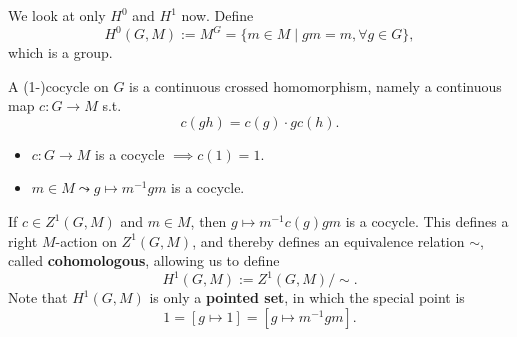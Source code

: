We look at only $H^0$ and $H^1$ now.
Define \[H^0(G, M) := M^G = \{m\in M\mid gm = m,\forall g\in G\},\]
which is a group.

A (1-)cocycle on $G$ is a continuous crossed homomorphism, namely a continuous map $c : G\to M$ s.t. \[c(gh) = c(g)\cdot gc(h).\]
\begin{itemize}
\item $c : G\to M$ is a cocycle $\implies c(1) = 1$.
\item $m\in M\leadsto g\mapsto m^{-1}gm$ is a cocycle.
\end{itemize}
If $c\in Z^1(G,M)$ and $m\in M$,
then $g\mapsto m^{-1}c(g)gm$ is a cocycle.
This defines a right $M$-action on $Z^1(G, M)$,
and thereby defines an equivalence relation $\sim$, called \textbf{cohomologous}, allowing us to define \[H^1(G, M) := Z^1(G, M)/\!\sim.\]
Note that $H^1(G, M)$ is only a \textbf{pointed set},
in which the special point is \[1 = [g\mapsto 1] = [g\mapsto m^{-1}gm].\]

